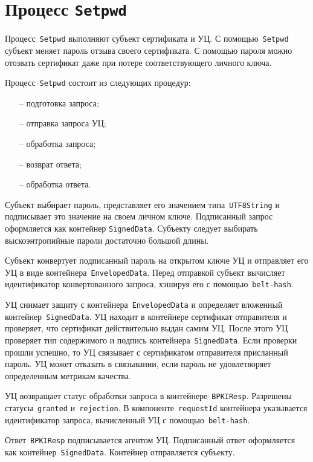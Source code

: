 \section{Процесс \texttt{Setpwd}}\label{PROCESSES.Setpwd}

Процесс~\texttt{Setpwd} выполняют субъект сертификата и УЦ.
С помощью~\texttt{Setpwd} субъект меняет пароль отзыва своего 
сертификата. С помощью пароля можно отозвать сертификат даже при потере 
соответствующего личного ключа.

Процесс~\texttt{Setpwd} состоит из следующих процедур:
\begin{itemize}
\item[--]
подготовка запроса;
\item[--]
отправка запроса УЦ;
\item[--]
обработка запроса;
\item[--]
возврат ответа;
\item[--]
обработка ответа.
\end{itemize}

Субъект выбирает пароль, представляет его значением типа~\texttt{UTF8String}
и подписывает это значение на своем личном ключе.
Подписанный запрос оформляется как контейнер \texttt{SignedData}.
%
Субъекту следует выбирать выскоэнтропийные пароли достаточно большой 
длины.

Субъект конвертует подписанный пароль на открытом ключе УЦ
и отправляет его УЦ в виде контейнера~\texttt{EnvelopedData}.
Перед отправкой субъект вычисляет идентификатор конвертованного запроса,
хэшируя его с помощью~\texttt{belt-hash}.

УЦ снимает защиту с контейнера~\texttt{EnvelopedData} и определяет 
вложенный контейнер~\texttt{SignedData}. УЦ находит в контейнере
сертификат отправителя и проверяет, что сертификат действительно 
выдан самим УЦ. После этого УЦ проверяет тип содержимого и подпись 
контейнера~\texttt{SignedData}.  Если проверки прошли успешно, то УЦ  
связывает с сертификатом отправителя присланный пароль. УЦ может отказать 
в связывании, если пароль не удовлетворяет определенным метрикам качества.

УЦ возвращает статус обработки запроса в контейнере~\texttt{BPKIResp}.
Разрешены статусы~\texttt{granted} и~\texttt{rejection}.
В компоненте~\texttt{requestId} контейнера указывается идентификатор 
запроса, вычисленный УЦ с помощью~\texttt{belt-hash}.

Ответ~\texttt{BPKIResp} подписывается агентом УЦ. 
Подписанный ответ оформляется как контейнер~\texttt{SignedData}. Контейнер 
отправляется субъекту.

